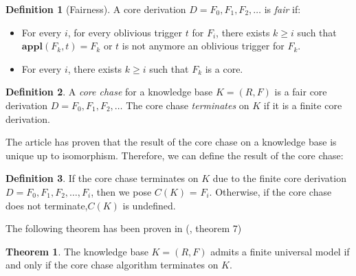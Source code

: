 \documentclass{article}
\theoremstyle{definition}
\newtheorem{definition}{Definition}[section]
\newtheorem{theorem}{Theorem}[section]
\theoremstyle{remark}
\newcommand{\Appl}{\textbf{appl}}
\begin{document}
\begin{definition}[Fairness]
A core derivation $D=F_0,F_1,F_2,\ldots$ is \emph{fair} if:
\begin{itemize}
\item For every $i$, for every oblivious trigger $t$ for $F_i$, there exists $k \geq i$ such that $\Appl(F_{k},t) = F_k$ or $t$ is not anymore an oblivious trigger for $F_k$.
\item For every $i$, there exists $k \geq i$ such that $F_k$ is a core.

\end{itemize}
\end{definition}

\begin{definition}
A \emph{core chase} for a knowledge base $K= (R,F)$ is a fair core derivation $D=F_0,F_1,F_2,\ldots$ The core chase \emph{terminates} on $K$ if it is a finite core derivation.
\end{definition}

The article \cite{core_chase} has proven that the result of the core chase on a knowledge base is unique up to isomorphism. Therefore, we can define the result of the core chase:

\begin{definition}
If the core chase terminates on $K$ due to the finite core derivation $D=F_0,F_1,F_2,\ldots,F_i$, then we pose \emph{$\textit{C}(K)$} = $F_i$. Otherwise, if the core chase does not terminate,$\textit{C}(K)$ is undefined.
\end{definition}

The following theorem has been proven in (\cite{core_chase}, theorem 7)

\begin{theorem}
The knowledge base $K = (R,F)$ admits a finite universal model if and only if the core chase algorithm terminates on $K$.
\end{theorem}
\end{document}

